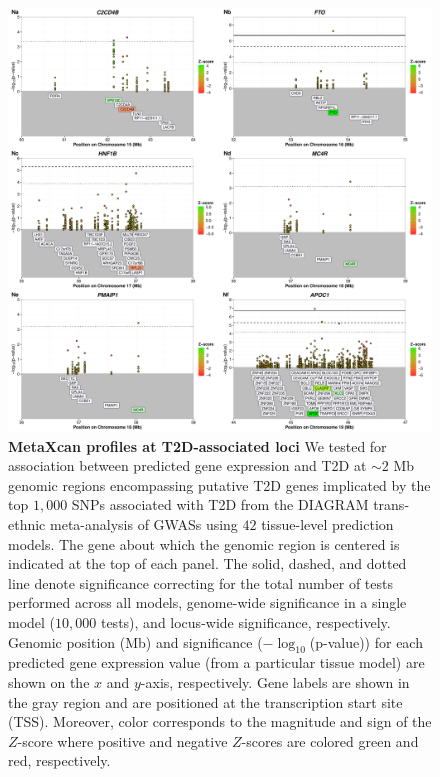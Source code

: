 \documentclass[10pt]{article}
\begin{document}
\begin{figure}
\ContinuedFloat
\includegraphics[width=\textwidth]{sup_fig1_part14_locusArray.pdf}
	\caption{\textbf{MetaXcan profiles at T2D-associated loci} We tested for association between predicted gene expression and T2D at $\sim2$ Mb genomic regions encompassing putative T2D genes implicated by the top $1,000$ SNPs associated with T2D from the DIAGRAM trans-ethnic meta-analysis of GWASs using $42$ tissue-level prediction models. The gene about which the genomic region is centered is indicated at the top of each panel. The solid, dashed, and dotted line denote significance correcting for the total number of tests performed across all models, genome-wide significance in a single model ($10,000$ tests), and locus-wide significance, respectively. Genomic position (Mb) and significance ($-\log_{10}$(p-value)) for each predicted gene expression value (from a particular tissue model) are shown on the $x$ and $y$-axis, respectively. Gene labels are shown in the gray region and are positioned at the transcription start site (TSS). Moreover, color corresponds to the magnitude and sign of the $Z$-score where positive and negative $Z$-scores are colored green and red, respectively.} 
    \label{fig:supp.locus_array_fig1_part14}
\end{figure}
\end{document}
